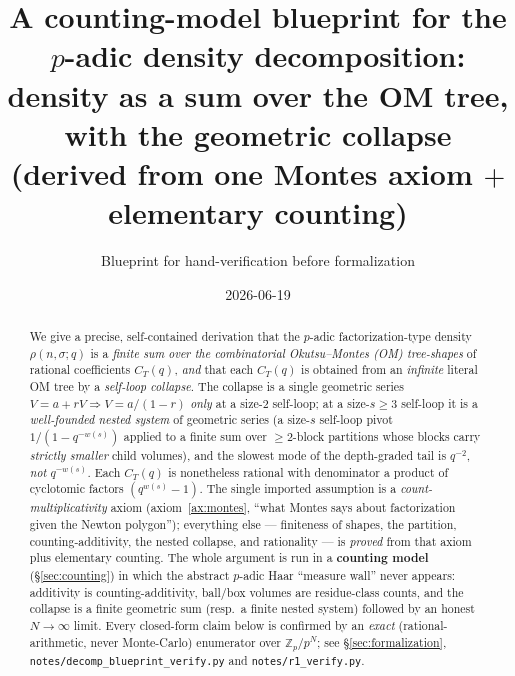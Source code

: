 \documentclass[11pt]{article}
\title{A counting-model blueprint for the $p$-adic density decomposition:\\
density as a sum over the OM tree, with the geometric collapse \\
\large (derived from one Montes axiom $+$ elementary counting)}
\author{Blueprint for hand-verification before formalization}
\date{2026-06-19}
\theoremstyle{definition}
\theoremstyle{remark}
\newcommand{\Zp}{\mathbb{Z}_p}
\newcommand{\rhocount}{\rho}
\begin{document}
\maketitle

\begin{abstract}
We give a precise, self-contained derivation that the $p$-adic factorization-type
density $\rhocount(n,\sigma;q)$ is a \emph{finite sum over the combinatorial
Okutsu--Montes (OM) tree-shapes} of rational coefficients $C_T(q)$, \emph{and}
that each $C_T(q)$ is obtained from an \emph{infinite} literal OM tree by a
\emph{self-loop collapse}. The collapse is a single geometric series
$V=a+rV\Rightarrow V=a/(1-r)$ \emph{only} at a size-$2$ self-loop; at a size-$s\ge3$
self-loop it is a \emph{well-founded nested system} of geometric series (a
size-$s$ self-loop pivot $1/(1-q^{-w(s)})$ applied to a finite sum over
$\ge2$-block partitions whose blocks carry \emph{strictly smaller} child volumes),
and the slowest mode of the depth-graded tail is $q^{-2}$, \emph{not} $q^{-w(s)}$.
Each $C_T(q)$ is nonetheless rational with denominator a product of cyclotomic
factors $(q^{w(s)}-1)$. The single imported assumption is a
\emph{count-multiplicativity} axiom (axiom~\ref{ax:montes}, ``what Montes says
about factorization given the Newton polygon''); everything else --- finiteness
of shapes, the partition, counting-additivity, the nested collapse, and
rationality --- is \emph{proved} from that axiom plus elementary counting.
The whole argument is run in a \textbf{counting model} (\S\ref{sec:counting}) in
which the abstract $p$-adic Haar ``measure wall'' never appears: additivity is
counting-additivity, ball/box volumes are residue-class counts, and the
collapse is a finite geometric sum (resp.\ a finite nested system) followed by an
honest $N\to\infty$ limit. Every closed-form claim below is confirmed by an
\emph{exact} (rational-arithmetic, never Monte-Carlo) enumerator over $\Zp/p^N$;
see \S\ref{sec:formalization}, \texttt{notes/decomp\_blueprint\_verify.py} and
\texttt{notes/r1\_verify.py}.
\end{abstract}
\end{document}
